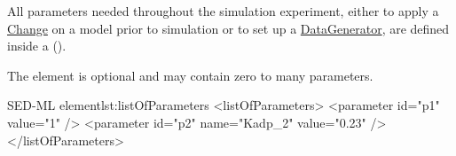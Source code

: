 \label{sec:listOfParameters}
All parameters needed throughout the simulation experiment, either to apply a \hyperref[class:change]{Change} on a model prior to simulation or to set up a \hyperref[class:dataGenerator]{DataGenerator},  are defined inside a  ().
%

The element is optional and may contain zero to many parameters.
%
\begin{myXmlLst}{SED-ML  element}{lst:listOfParameters}
<listOfParameters>
 <parameter id="p1" value="1" />
 <parameter id="p2" name="Kadp_2" value="0.23" />
</listOfParameters>
\end{myXmlLst}
%


